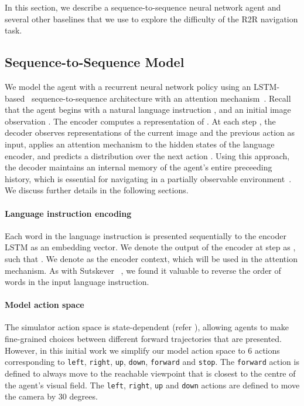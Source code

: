 \documentclass[10pt,twocolumn,letterpaper]{article}
\begin{document}
In this section, we describe a sequence-to-sequence neural network agent and several other baselines that we use to explore the difficulty of the R2R navigation task. 
\subsection{Sequence-to-Sequence Model}

We model the agent with a recurrent neural network policy using an LSTM-based~\cite{Hochreiter1997} sequence-to-sequence architecture with an attention mechanism~\cite{Bahdanau2015}. Recall that the agent begins with a natural language instruction , and an initial image observation . The encoder computes a representation of . At each step , the decoder observes representations of the current image  and the previous action  as input, applies an attention mechanism to the hidden states of the language encoder, and predicts a distribution over the next action . Using this approach, the decoder maintains an internal memory of the agent's entire preceeding history, which is essential for navigating in a partially observable environment~\cite{wierstra2007solving}. We discuss further details in the following sections. 

\vspace{-0.3cm}
\paragraph{Language instruction encoding} 

Each word  in the language instruction is presented sequentially to the encoder LSTM as an embedding vector. We denote the output of the encoder at step  as , such that . We denote  as the encoder context, which will be used in the attention mechanism. As with Sutskever \etal~\cite{Sutskever2014}, we found it valuable to reverse the order of words in the input language instruction. 

\vspace{-0.3cm}
\paragraph{Model action space}

The simulator action space is state-dependent (refer ), allowing agents to make fine-grained choices between different forward trajectories that are presented. However, in this initial work we simplify our model action space to 6 actions corresponding to \texttt{left}, \texttt{right}, \texttt{up}, \texttt{down}, \texttt{forward} and \texttt{stop}. The \texttt{forward} action is defined to always move to the reachable viewpoint that is closest to the centre of the agent's visual field. The \texttt{left}, \texttt{right}, \texttt{up} and \texttt{down} actions are defined to move the camera by 30 degrees.
\end{document}
